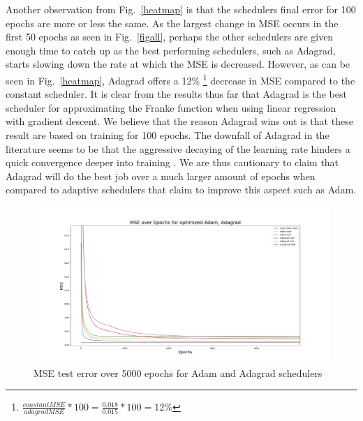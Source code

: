 \documentclass[onecolumn,10pt,cleanfoot]{asme2ej}
\begin{document}
Another observation from Fig.~\ref{heatmap} is that the schedulers final error for 100 epochs are more or less the same. As the largest change in MSE occurs in the first 50 epochs as seen in Fig.~\ref{figall}, perhaps the other schedulers are given enough time to catch up as the best performing schedulers, such as Adagrad, starts slowing down the rate at which the MSE is decreased. However, as can be seen in Fig.~\ref{heatmap}, Adagrad offers a 12\% \footnote{$\frac{constant MSE}{adagrad MSE} * 100 = \frac{0.018}{0.015} * 100 = 12\%$} decrease in MSE compared to the constant scheduler. It is clear from the results thus far that Adagrad is the best scheduler for approximating the Franke function when using linear regression with gradient descent. We believe that the reason Adagrad wins out is that these result are based on training for 100 epochs. The downfall of Adagrad in the literature seems to be that the aggressive decaying of the learning rate hinders a quick convergence deeper into training \cite{datasci}. We are thus cautionary to claim that Adagrad will do the best job over a much larger amount of epochs when compared to adaptive schedulers that claim to improve this aspect such as Adam.

\begin{figure}[h]
\centerline{\includegraphics[width=5in]{figure/5000e_adam_v_adagrad.png}}
\caption{MSE test error over 5000 epochs for Adam and Adagrad schedulers}
\label{adam_v_adagrad}
\end{figure}
\end{document}
